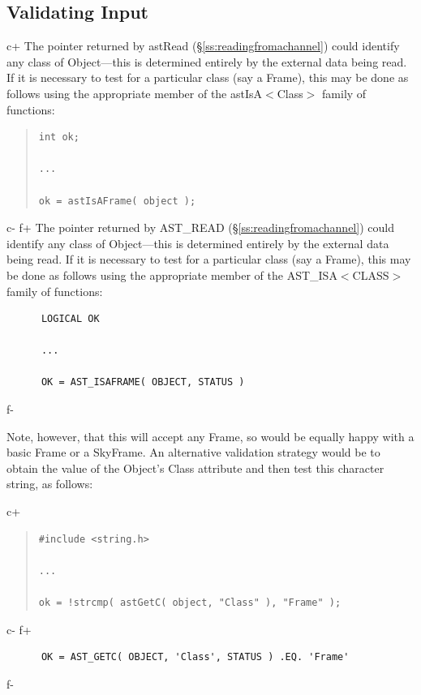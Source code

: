 \documentclass[twoside,11pt]{article}
\newcommand{\secref}[1]{\S\ref{#1}}
\newcommand{\secref}[1]{\ref{#1}}
\begin{document}
\subsection{\label{ss:validatinginput}Validating Input}

c+
The pointer returned by astRead (\secref{ss:readingfromachannel}) could
identify any class of Object---this is determined entirely by the
external data being read. If it is necessary to test for a particular
class (say a Frame), this may be done as follows using the appropriate
member of the astIsA$<$Class$>$ family of functions:

\begin{quote}
\small
\begin{verbatim}
int ok;

...

ok = astIsAFrame( object );
\end{verbatim}
\normalsize
\end{quote}
c-
f+
The pointer returned by AST\_READ (\secref{ss:readingfromachannel})
could identify any class of Object---this is determined entirely by
the external data being read. If it is necessary to test for a
particular class (say a Frame), this may be done as follows using the
appropriate member of the AST\_ISA$<$CLASS$>$ family of functions:

\small
\begin{verbatim}
      LOGICAL OK

      ...

      OK = AST_ISAFRAME( OBJECT, STATUS )
\end{verbatim}
\normalsize
f-

Note, however, that this will accept any Frame, so would be equally
happy with a basic Frame or a SkyFrame.  An alternative validation
strategy would be to obtain the value of the Object's Class attribute
and then test this character string, as follows:

c+
\begin{quote}
\small
\begin{verbatim}
#include <string.h>

...

ok = !strcmp( astGetC( object, "Class" ), "Frame" );
\end{verbatim}
\normalsize
\end{quote}
c-
f+
\small
\begin{verbatim}
      OK = AST_GETC( OBJECT, 'Class', STATUS ) .EQ. 'Frame'
\end{verbatim}
\normalsize
f-
\end{document}
